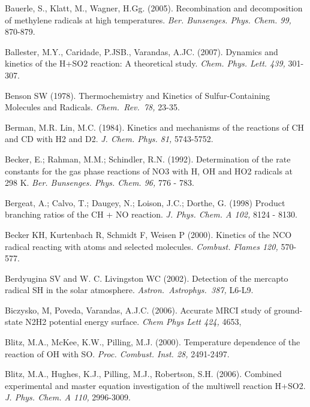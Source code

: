 \documentclass[12pt,landscape]{article}
\newcounter{reaction}
\begin{document}
Bauerle, S., Klatt, M., Wagner, H.Gg. (2005). Recombination and decomposition of methylene radicals at high temperatures. {\em Ber. Bunsenges. Phys. Chem. 99,} 870-879.

Ballester, M.Y., Caridade, P.JSB., Varandas, A.JC. (2007). Dynamics and kinetics of the H+SO2 reaction: A theoretical study. {\em Chem. Phys. Lett. 439,} 301-307.

Benson SW (1978). Thermochemistry and Kinetics of Sulfur-Containing Molecules and Radicals. {\em Chem.\ Rev.\ 78,} 23-35.

Berman, M.R. Lin, M.C. (1984). Kinetics and mechanisms of the reactions of CH and CD with H2 and D2. {\em J. Chem. Phys. 81,} 5743-5752.

Becker, E.; Rahman, M.M.; Schindler, R.N. (1992). Determination of the rate constants for the gas phase reactions of NO3 with H, OH and HO2 radicals at 298 K. {\em Ber. Bunsenges. Phys. Chem. 96,} 776 - 783.

Bergeat, A.; Calvo, T.; Daugey, N.; Loison, J.C.; Dorthe, G. (1998)
 Product branching ratios of the CH + NO reaction.
{\em J. Phys. Chem. A 102,} 8124 - 8130.

Becker KH, Kurtenbach R, Schmidt F, Weisen P (2000). Kinetics of the NCO radical reacting with atoms and selected molecules. {\em Combust. Flames 120,} 570-577.

 Berdyugina SV and W. C. Livingston WC (2002). Detection of the mercapto radical SH in the solar atmosphere. {\em Astron.\ Astrophys.\ 387,} L6-L9.


Biczysko, M, Poveda, Varandas, A.J.C. (2006). Accurate MRCI study of ground-state N2H2 potential energy surface. {\em Chem Phys Lett 424,} 4653,

Blitz, M.A., McKee, K.W., Pilling, M.J. (2000). Temperature dependence of the reaction of OH with SO. {\em Proc. Combust. Inst. 28,} 2491-2497.

Blitz, M.A., Hughes, K.J., Pilling, M.J., Robertson, S.H. (2006).  Combined experimental and master equation investigation of the multiwell reaction H+SO2.  {\em J. Phys. Chem. A  110,} 2996-3009.
\end{document}
